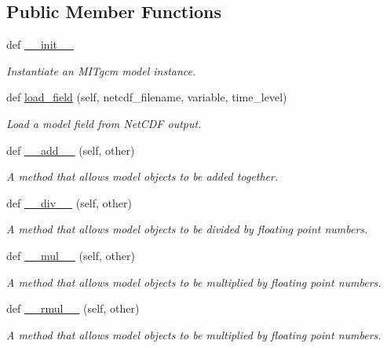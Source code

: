 \subsection*{Public Member Functions}
\begin{DoxyCompactItemize}
\item 
def \hyperlink{classmitgcm_1_1Simulation_a70d5c97bfc092a294646a5925034361b}{\+\_\+\+\_\+init\+\_\+\+\_\+}
\begin{DoxyCompactList}\small\item\em Instantiate an M\+I\+Tgcm model instance. \end{DoxyCompactList}\item 
def \hyperlink{classmitgcm_1_1Simulation_aa47ff0ed9982415c3d16f88affdc8388}{load\+\_\+field} (self, netcdf\+\_\+filename, variable, time\+\_\+level)
\begin{DoxyCompactList}\small\item\em Load a model field from Net\+C\+D\+F output. \end{DoxyCompactList}\item 
def \hyperlink{classmitgcm_1_1Simulation_a6b26e646c9f01c1ddf58a448a072fb2d}{\+\_\+\+\_\+add\+\_\+\+\_\+} (self, other)
\begin{DoxyCompactList}\small\item\em A method that allows model objects to be added together. \end{DoxyCompactList}\item 
def \hyperlink{classmitgcm_1_1Simulation_a17254758711548c89746bf6893bff1ae}{\+\_\+\+\_\+div\+\_\+\+\_\+} (self, other)
\begin{DoxyCompactList}\small\item\em A method that allows model objects to be divided by floating point numbers. \end{DoxyCompactList}\item 
def \hyperlink{classmitgcm_1_1Simulation_a6baca2249c5ce98b265114ad02c989db}{\+\_\+\+\_\+mul\+\_\+\+\_\+} (self, other)
\begin{DoxyCompactList}\small\item\em A method that allows model objects to be multiplied by floating point numbers. \end{DoxyCompactList}\item 
def \hyperlink{classmitgcm_1_1Simulation_af7967aee81cbe73da6684a86b89085b2}{\+\_\+\+\_\+rmul\+\_\+\+\_\+} (self, other)
\begin{DoxyCompactList}\small\item\em A method that allows model objects to be multiplied by floating point numbers. \end{DoxyCompactList}\end{DoxyCompactItemize}
